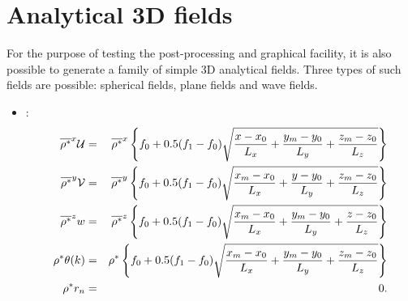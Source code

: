 \section{Analytical 3D fields}

For the purpose of testing the post-processing and graphical facility, it
is also possible to generate a family of simple 3D analytical fields.
Three types of such fields are possible: spherical fields, plane
fields and wave fields.
\begin{itemize}
\item {}:
\begin{eqnarray}
\overline{\rho^{*}}^{x} {\cal U} & = &  \overline{\rho^{*}}^{x}
\left\{ f_{0} + 0.5  (f_{1}- f_{0}) \sqrt{\dfrac{x-x_{0}}{L_{x}}
+ \dfrac{y_{m}-y_{0}}{L_{y}} + \dfrac{z_{m}-z_{0}}{L_{z}}}    \right\}
\\
\overline{\rho^{*}}^{y}{\cal V} & = &    \overline{\rho^{*}}^{y}
\left\{ f_{0} + 0.5  (f_{1}- f_{0}) \sqrt{\dfrac{x_{m}-x_{0}}{L_{x}}
+ \dfrac{y-y_{0}}{L_{y}} + \dfrac{z_{m}-z_{0}}{L_{z}}}    \right\}
\\
\overline{ \rho^{*}}^{z} w & = &  \overline{\rho^{*}}^{z}
\left\{ f_{0} + 0.5  (f_{1}- f_{0}) \sqrt{\dfrac{x_{m}-x_{0}}{L_{x}}
+ \dfrac{y_{m}-y_{0}}{L_{y}} + \dfrac{z-z_{0}}{L_{z}}}    \right\}
 \\
\rho^{*} \theta(k) & = &   \rho^{*} \left\{ f_{0}
+ 0.5  (f_{1}- f_{0}) \sqrt{\dfrac{x_{m}-x_{0}}{L_{x}}
+ \dfrac{y_{m}-y_{0}}{L_{y}} + \dfrac{z_{m}-z_{0}}{L_{z}}}    \right\}
\\
\rho^{*} r_{n} & = & 0.
\end{eqnarray}


\end{itemize}
